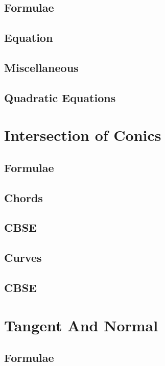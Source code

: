 \documentclass[journal]{IEEEtran}
\begin{document}
\subsection{Formulae}

\subsection{Equation}

\subsection{Miscellaneous}

\subsection{Quadratic Equations}

\newpage
\section{Intersection of Conics}
\subsection{Formulae}

\subsection{Chords}

\subsection{CBSE}

\subsection{Curves}

\subsection{CBSE}


\newpage
\section{Tangent And Normal}
\subsection{Formulae}

\end{document}
